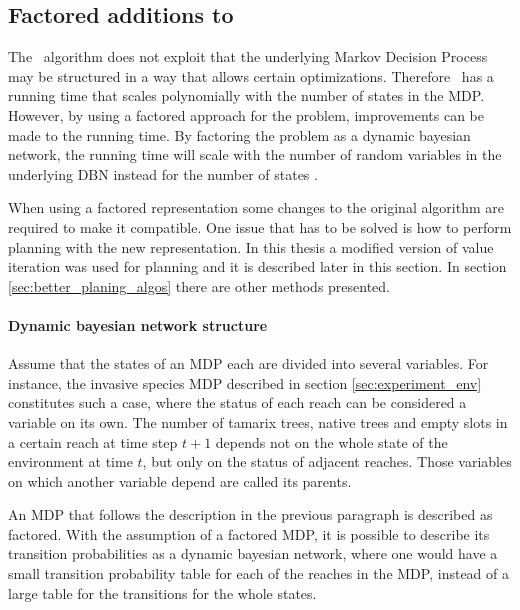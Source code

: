 \subsection{Factored additions to \etre}
\label{sec:factored_e3}

The \etre\ algorithm does not exploit that the underlying Markov Decision
Process may be structured in a way that allows certain optimizations. Therefore
\etre\ has a running time that scales polynomially with the number of states in
the MDP. However, by using a factored approach for the problem, improvements
can be made to the running time. By factoring the problem as a dynamic bayesian
network, the running time will scale with the number of random variables in the
underlying DBN instead for the number of states
\parencite{kearns1999efficient}. 

When using a factored representation some changes to the original algorithm are
required to make it compatible. One issue that has to be solved is how to
perform  planning with the new representation. In this thesis a modified version
of value iteration was used for planning and it is described later in this
section. In section \ref{sec:better_planing_algos} there are other methods
presented.


\paragraph{Dynamic bayesian network structure}

Assume that the states of an MDP each are divided into several variables. For
instance, the invasive species MDP described in section
\ref{sec:experiment_env} constitutes such a case, where the status of each
reach can be considered a variable on its own. The number of tamarix trees,
native trees and empty slots in a certain reach at time step $t+1$ depends not
on the whole state of the environment at time $t$, but only on the status of
adjacent reaches. Those variables on which another variable depend are called
its parents.  

An MDP that follows the description in the previous paragraph is described as
factored. With the assumption of a factored MDP, it is possible to describe its
transition probabilities as a dynamic bayesian network, where one would have a
small transition probability table for each of the reaches in the MDP, instead
of a large table for the transitions for the whole states.
